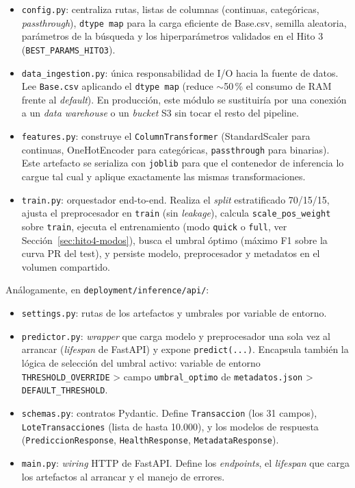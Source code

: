 \documentclass[12pt,a4paper]{report}
\begin{document}
\begin{itemize}
    \item \texttt{config.py}: centraliza rutas, listas de columnas (continuas, categóricas, \textit{passthrough}), \texttt{dtype map} para la carga eficiente de Base.csv, semilla aleatoria, parámetros de la búsqueda y los hiperparámetros validados en el Hito 3 (\texttt{BEST\_PARAMS\_HITO3}).
    \item \texttt{data\_ingestion.py}: única responsabilidad de I/O hacia la fuente de datos. Lee \texttt{Base.csv} aplicando el \texttt{dtype map} (reduce $\sim$50\,\% el consumo de RAM frente al \textit{default}). En producción, este módulo se sustituiría por una conexión a un \textit{data warehouse} o un \textit{bucket} S3 sin tocar el resto del pipeline.
    \item \texttt{features.py}: construye el \texttt{ColumnTransformer} (StandardScaler para continuas, OneHotEncoder para categóricas, \texttt{passthrough} para binarias). Este artefacto se serializa con \texttt{joblib} para que el contenedor de inferencia lo cargue tal cual y aplique exactamente las mismas transformaciones.
    \item \texttt{train.py}: orquestador end-to-end. Realiza el \textit{split} estratificado 70/15/15, ajusta el preprocesador en \texttt{train} (sin \textit{leakage}), calcula \texttt{scale\_pos\_weight} sobre \texttt{train}, ejecuta el entrenamiento (modo \texttt{quick} o \texttt{full}, ver Sección~\ref{sec:hito4-modos}), busca el umbral óptimo (máximo F1 sobre la curva PR del test), y persiste modelo, preprocesador y metadatos en el volumen compartido.
\end{itemize}

Análogamente, en \texttt{deployment/inference/api/}:

\begin{itemize}
    \item \texttt{settings.py}: rutas de los artefactos y umbrales por variable de entorno.
    \item \texttt{predictor.py}: \textit{wrapper} que carga modelo y preprocesador una sola vez al arrancar (\textit{lifespan} de FastAPI) y expone \texttt{predict(...)}. Encapsula también la lógica de selección del umbral activo: variable de entorno \texttt{THRESHOLD\_OVERRIDE} > campo \texttt{umbral\_optimo} de \texttt{metadatos.json} > \texttt{DEFAULT\_THRESHOLD}.
    \item \texttt{schemas.py}: contratos Pydantic. Define \texttt{Transaccion} (los 31 campos), \texttt{LoteTransacciones} (lista de hasta 10.000), y los modelos de respuesta (\texttt{PrediccionResponse}, \texttt{HealthResponse}, \texttt{MetadataResponse}).
    \item \texttt{main.py}: \textit{wiring} HTTP de FastAPI. Define los \textit{endpoints}, el \textit{lifespan} que carga los artefactos al arrancar y el manejo de errores.
\end{itemize}
\end{document}

